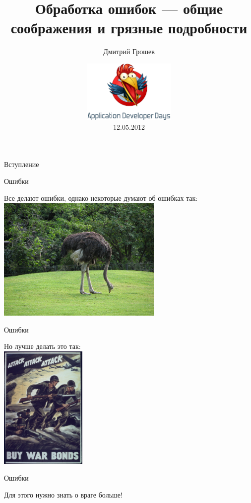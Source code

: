 \documentclass[10pt]{beamer}
\title[Об ошибках]{Обработка ошибок — общие соображения и грязные подробности}
\author{Дмитрий Грошев}
\date{\includegraphics[height=3cm]{add-large}\\12.05.2012}
\institute{}
\begin{document}
\begin{frame}
\titlepage
\end{frame}

\begin{frame}{}
  \begin{center}
    \huge Вступление
  \end{center}
\end{frame}

\begin{frame}{Ошибки}
  \begin{center}
    Все делают ошибки, однако некоторые думают об ошибках так:\vspace{3mm}\\
    \includegraphics[height=6cm]{ostrich}
  \end{center}
\end{frame}

\begin{frame}{Ошибки}
  \begin{center}
    Но лучше делать это так:\vspace{3mm}\\
    \includegraphics[height=6cm]{attack}
  \end{center}
\end{frame}

\begin{frame}{Ошибки}
  \begin{center}
    Для этого нужно знать о враге больше!
  \end{center}
\end{frame}
\end{document}
